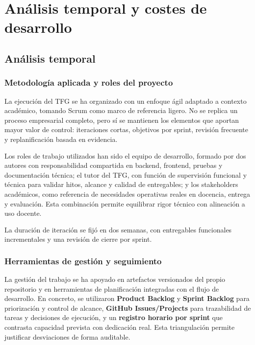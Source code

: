 \chapter{An\'alisis temporal y costes de desarrollo}\label{anatemporal}
\makeatletter
{}
\makeatother

\FloatBarrier
\section{An\'alisis temporal}
\subsection{Metodolog\'ia aplicada y roles del proyecto}

La ejecuci\'on del TFG se ha organizado con un enfoque \'agil adaptado a contexto acad\'emico,
tomando Scrum como marco de referencia ligero.
No se replica un proceso empresarial completo,
pero s\'i se mantienen los elementos que aportan mayor valor de control:
iteraciones cortas, objetivos por sprint, revisi\'on frecuente y replanificaci\'on basada en evidencia.

Los roles de trabajo utilizados han sido el equipo de desarrollo, formado por dos autores con responsabilidad compartida en backend, frontend, pruebas y documentaci\'on t\'ecnica; el tutor del TFG, con funci\'on de supervisi\'on funcional y t\'ecnica para validar hitos, alcance y calidad de entregables; y los stakeholders acad\'emicos, como referencia de necesidades operativas reales en docencia, entrega y evaluaci\'on. Esta combinaci\'on permite equilibrar rigor t\'ecnico con alineaci\'on a uso docente.

La duraci\'on de iteraci\'on se fij\'o en dos semanas,
con entregables funcionales incrementales y una revisi\'on de cierre por sprint.

\subsection{Herramientas de gesti\'on y seguimiento}

La gesti\'on del trabajo se ha apoyado en artefactos versionados del propio repositorio y en herramientas de planificaci\'on integradas con el flujo de desarrollo. En concreto, se utilizaron \textbf{Product Backlog} y \textbf{Sprint Backlog} para priorizaci\'on y control de alcance, \textbf{GitHub Issues/Projects} para trazabilidad de tareas y decisiones de ejecuci\'on, y un \textbf{registro horario por sprint} que contrasta capacidad prevista con dedicaci\'on real. Esta triangulaci\'on permite justificar desviaciones de forma auditable.

